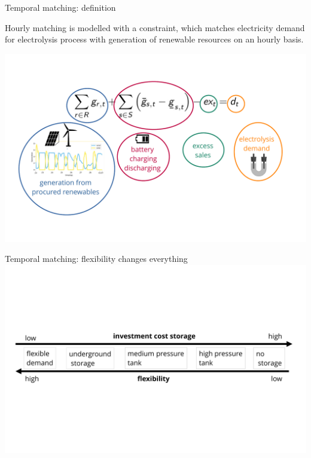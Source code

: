 \begin{frame}{Temporal matching: definition}
\addtocounter{framenumber}{-1}
  \alert{Hourly matching} is modelled with a constraint, 
  which matches electricity demand for electrolysis process with generation of renewable resources on an hourly basis. 

  \centering
  \includegraphics[width=0.6\linewidth, clip, trim={0cm 0cm 0cm 0cm}]{images/hourly_eq_explained}
\end{frame}


\begin{frame}{Temporal matching: flexibility changes everything}
	\vspace{-5cm} 
	\centering
	\includegraphics[width=0.6\linewidth, clip, trim={0cm 5cm 0cm 5cm}]{images/store_flexibility_v2}


\end{frame}

